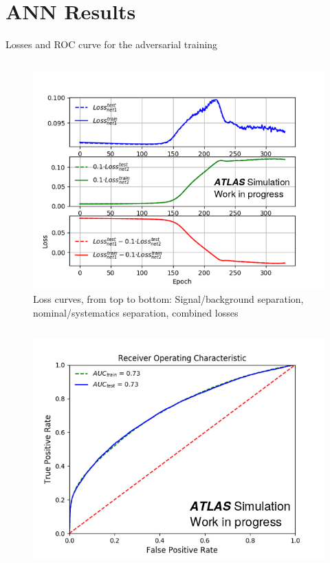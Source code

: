 \documentclass[12pt]{beamer}
\begin{document}
\section{ANN Results}



\begin{frame}{Losses and ROC curve for the adversarial training}
\vspace{-1cm}
    \begin{column}{0.5\textwidth}
    \begin{figure}
        \centering
        \includegraphics[width=1.1\textwidth]{losses_sgd.png}
        \caption{Loss curves, from top to bottom: Signal/background separation, nominal/systematics separation, combined losses}
        \label{fig:my_label}
    \end{figure}
\end{column}
\begin{column}{0.5\textwidth}
    \begin{figure}
        \centering
        \includegraphics[width=1.1\textwidth]{adver_ROC.png}

\end{figure}
\end{column}
\end{frame}
\end{document}
